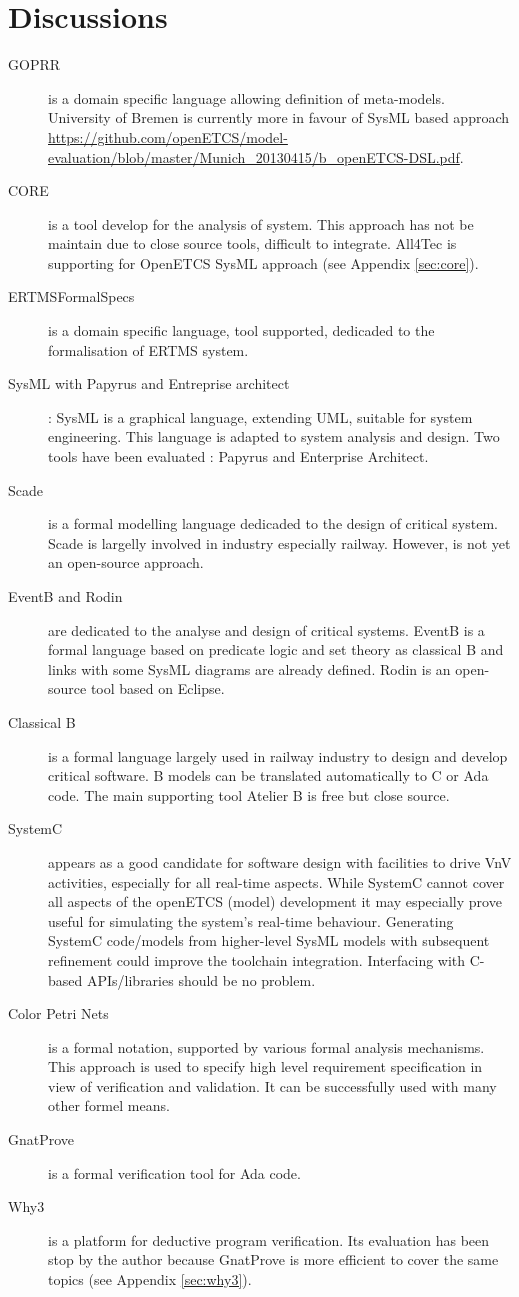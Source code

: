 \section{Discussions}


\begin{description}
\item[GOPRR] is a domain specific language allowing definition of meta-models. University of Bremen is currently  more in favour of SysML based approach \url{https://github.com/openETCS/model-evaluation/blob/master/Munich_20130415/b_openETCS-DSL.pdf}.
\item[CORE] is a tool  develop for the analysis of system.  This approach has not be maintain due to close source tools, difficult to  integrate. All4Tec is supporting for OpenETCS SysML approach (see Appendix \ref{sec:core}).
\item[ERTMSFormalSpecs] is a domain specific language, tool supported, dedicaded to the formalisation of ERTMS system.
\item[SysML with Papyrus and Entreprise architect]: SysML is a graphical language, extending UML, suitable for system engineering. This language is adapted to  system  analysis and design. Two  tools have been evaluated : Papyrus and Enterprise Architect.
\item[Scade] is a formal modelling language dedicaded to the design of critical system. Scade is largelly  involved in industry  especially  railway. However, is not yet an open-source approach.
\item[EventB and Rodin] are dedicated to the analyse and design of critical  systems. EventB is a formal language based on predicate logic and set theory as classical B and links with some SysML  diagrams are already defined. Rodin is an open-source tool based on Eclipse.
\item[Classical B] is a formal  language largely used in railway industry  to  design and develop critical software. B models can be translated automatically to  C or Ada code. The main supporting tool Atelier B is free but close source.
\item[SystemC]  appears as a good candidate for software design with facilities to drive VnV activities, especially for all real-time aspects. While SystemC cannot cover all aspects of the openETCS (model) development it may especially prove useful for simulating the system's real-time behaviour. Generating SystemC code/models from higher-level SysML models with subsequent refinement could improve the toolchain integration. Interfacing with C-based APIs/libraries should be no problem. 
\item[Color Petri Nets] is a formal notation, supported by various formal analysis mechanisms. This approach is used to  specify high level requirement specification in view of verification and validation. It can be successfully used with many other formel means.
\item[GnatProve] is a formal verification tool for Ada code. 
\item[Why3] is a platform for deductive program verification. Its evaluation has been stop by the author because GnatProve is more efficient to cover the same topics (see Appendix \ref{sec:why3}).
\end{description}